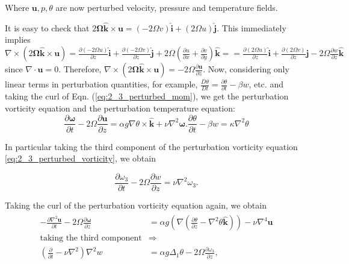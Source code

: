 Where $\boldsymbol{u}, p, \theta$ are now perturbed velocity, pressure and temperature fields. 

It is easy to check that $2\boldsymbol{\Omega \hat{k}} \times \boldsymbol{u} =  (-2\Omega v)\boldsymbol{\hat{i}} + (2\Omega u)\boldsymbol{\hat{j}}$. This immediately implies  $\nabla \times (2\boldsymbol{\Omega \hat{k}} \times \boldsymbol{u}) = \frac{\partial (-2\Omega u)}{\partial z} \boldsymbol{\hat{i}} + \frac{\partial (-2\Omega v)}{\partial z} \boldsymbol{\hat{j}}  + 2\Omega\left(\frac{\partial u}{\partial x} + \frac{\partial v}{\partial y}\right) \boldsymbol{\hat{k}} = = \frac{\partial (2\Omega u)}{\partial z} \boldsymbol{\hat{i}} + \frac{\partial (2\Omega v)}{\partial z} \boldsymbol{\hat{j}}  - 2\Omega\frac{\partial w}{\partial z} \boldsymbol{\hat{k}}$ since $\nabla \cdot \boldsymbol{u} = 0$. Therefore, $\nabla \times (2\boldsymbol{\Omega \hat{k}} \times \boldsymbol{u}) = -2\Omega \frac{\partial \boldsymbol{u}}{\partial z}$. Now, considering only linear terms in perturbation quantities, for example,
$\frac{D\theta}{Dt} = \frac{\partial \theta}{\partial t} - \beta w$, etc. and taking the curl of Eqn. (\ref{eq:2_3_perturbed_mom}), we get the perturbation vorticity equation and the perturbation temperature equation:
\begin{subequations}
 \begin{equation}\label{eq:2_3_perturbed_vorticity}
\frac{\partial \boldsymbol{\omega}}{\partial t} - 2\Omega\frac{\partial \boldsymbol{u}}{\partial {z}} = \alpha g \nabla \theta \times \boldsymbol{\hat{k}} + \nu \nabla^{2} \boldsymbol{\omega}.  
 \end{equation}
 \begin{equation} \label{eq:2_3_perturbed_energy}
  \frac{\partial \theta}{\partial t} - \beta w = \kappa \nabla^{2} \theta
 \end{equation}
\end{subequations}

In particular taking the third component of the perturbation vorticity equation \ref{eq:2_3_perturbed_vorticity}, we obtain

\begin{equation}\label{eq:2_3_perturbed_vorticity_z}
 \frac{\partial \omega_{3}}{\partial t} - 2\Omega\frac{\partial w}{\partial {z}} = \nu \nabla^{2} \omega_{3}.
\end{equation}

Taking the curl of the perturbation vorticity equation again, we obtain
\begin{align}\label{eq:2_3_curl_perturbed_vorticity}
\begin{split}
 -\frac{\partial \nabla^{2}\boldsymbol{u}}{\partial t} - 2\Omega \frac{\partial \boldsymbol{\omega}}{\partial {z}} &= \alpha g \left(\nabla\left(\frac{\partial \theta}{\partial z} - \nabla^{2} \theta\boldsymbol{\hat{k}}\right) \right) - \nu \nabla^{4} \boldsymbol{u}\\
\textrm{taking the third component} &  \Rightarrow  \\
\left(\frac{\partial}{\partial t} - \nu \nabla^{2}\right) \nabla^{2} w &= \alpha g \Delta_{1} \theta - 2 \Omega \frac{\partial \omega_{3}}{\partial z},
\end{split}
\end{align}

